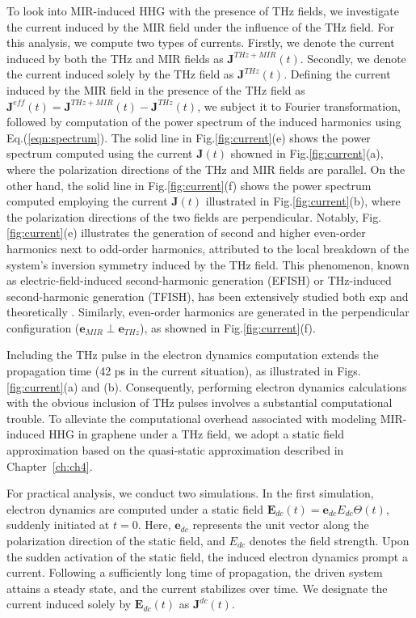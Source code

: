 To look into MIR-induced \gls{HHG} with the presence of THz fields, we investigate the current induced by the MIR field under the influence of the THz field. For this analysis, we compute two types of currents. Firstly, we denote the current induced by both the THz and MIR fields as $\mathbf J^{THz + MIR}(t)$. Secondly, we denote the current induced solely by the THz field as $\mathbf J^{THz}(t)$. Defining the current induced by the MIR field in the presence of the THz field as $\mathbf J^{eff}(t) = \mathbf J^{THz + MIR}(t) - \mathbf J^{THz}(t)$, we subject it to Fourier transformation, followed by computation of the power spectrum of the induced harmonics using Eq.(\ref{eqn:spectrum}). The solid line in Fig.\ref{fig:current}(e) shows the power spectrum computed using the current $\mathbf J(t)$ showned in Fig.\ref{fig:current}(a), where the polarization directions of the THz and MIR fields are parallel. On the other hand, the solid line in Fig.\ref{fig:current}(f) shows the power spectrum computed employing the current $\mathbf J(t)$ illustrated in Fig.\ref{fig:current}(b), where the polarization directions of the two fields are perpendicular. Notably, Fig.\ref{fig:current}(e) illustrates the generation of second and higher even-order harmonics next to odd-order harmonics, attributed to the local breakdown of the system's inversion symmetry induced by the THz field. This phenomenon, known as electric-field-induced second-harmonic generation (EFISH) or THz-induced second-harmonic generation (TFISH), has been extensively studied both exp and theoretically \cite{PhysRevLett.8.404,PhysRev.137.A801,Nahata:98,COOK1999221}. Similarly, even-order harmonics are generated in the perpendicular configuration ($\mathbf e_{MIR} \perp \mathbf e_{THz}$), as showned in Fig.\ref{fig:current}(f).

Including the THz pulse in the electron dynamics computation extends the propagation time (42 ps in the current situation), as illustrated in Figs.\ref{fig:current}(a) and (b). Consequently, performing electron dynamics calculations with the obvious inclusion of THz pulses involves a substantial computational trouble. To alleviate the computational overhead associated with modeling MIR-induced \gls{HHG} in graphene under a THz field, we adopt a static field approximation based on the quasi-static approximation described in Chapter~\ref{ch:ch4}.

For practical analysis, we conduct two simulations. In the first simulation, electron dynamics are computed under a static field $\mathbf E_{dc}(t) = \mathbf e_{dc} E_{dc}\Theta(t)$, suddenly initiated at $t=0$. Here, $\mathbf e_{dc}$ represents the unit vector along the polarization direction of the static field, and $E_{dc}$ denotes the field strength. Upon the sudden activation of the static field, the induced electron dynamics prompt a current. Following a sufficiently long time of propagation, the driven system attains a steady state, and the current stabilizes over time. We designate the current induced solely by $\mathbf E_{dc}(t)$ as $\mathbf J^{dc}(t)$.

